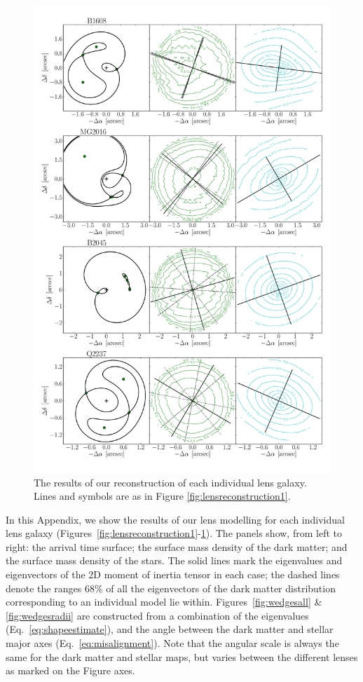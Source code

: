 \documentclass[useAMS,usenatbib]{mn2e}
\begin{document}
\begin{figure}
  \centering
  \includegraphics[width=.8\linewidth]{Figures/AllLenses33.pdf}
  \caption[width=.65\linewidth]{The results of our reconstruction of each individual lens galaxy. Lines and symbols are as in Figure \ref{fig:lensreconstruction1}.}
  \label{fig:lensreconstruction3}
\end{figure}

In this Appendix, we show the results of our lens modelling for each individual lens galaxy (Figures~\ref{fig:lensreconstruction1}-\ref{fig:lensreconstruction3}). The panels show, from left to right: the arrival time surface; the surface mass density of the dark matter; and the surface mass density of the stars. The solid lines mark the eigenvalues and eigenvectors of the 2D moment of inertia tensor in each case; the dashed lines denote the ranges 68\% of all the eigenvectors of the dark matter distribution corresponding to an individual model lie within. Figures~\ref{fig:wedgesall} \& \ref{fig:wedgesradii} are constructed from a combination of the eigenvalues (Eq.~\ref{eq:shapeestimate}), and the angle between the dark matter and stellar major axes (Eq.~\ref{eq:misalignment}). Note that the angular scale is always the same for the dark matter and stellar maps, but varies between the different lenses as marked on the Figure axes.
\end{document}
